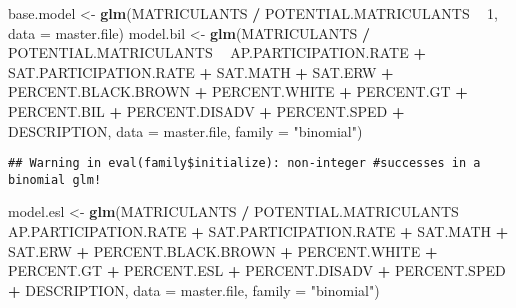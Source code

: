 \documentclass[
]{article}
\newenvironment{Shaded}{\begin{snugshade}}{\end{snugshade}}
\newcommand{\DataTypeTok}[1]{\textcolor[rgb]{0.13,0.29,0.53}{#1}}
\newcommand{\DecValTok}[1]{\textcolor[rgb]{0.00,0.00,0.81}{#1}}
\newcommand{\KeywordTok}[1]{\textcolor[rgb]{0.13,0.29,0.53}{\textbf{#1}}}
\newcommand{\NormalTok}[1]{#1}
\newcommand{\OperatorTok}[1]{\textcolor[rgb]{0.81,0.36,0.00}{\textbf{#1}}}
\newcommand{\StringTok}[1]{\textcolor[rgb]{0.31,0.60,0.02}{#1}}
\begin{document}
\begin{Shaded}
\begin{Highlighting}[]
\NormalTok{base.model <-}\StringTok{ }\KeywordTok{glm}\NormalTok{(MATRICULANTS }\OperatorTok{/}\StringTok{ }\NormalTok{POTENTIAL.MATRICULANTS }\OperatorTok{~}\StringTok{ }\DecValTok{1}\NormalTok{, }\DataTypeTok{data =}\NormalTok{ master.file)}
\NormalTok{model.bil <-}\StringTok{ }\KeywordTok{glm}\NormalTok{(MATRICULANTS }\OperatorTok{/}\StringTok{ }\NormalTok{POTENTIAL.MATRICULANTS }\OperatorTok{~}\StringTok{ }\NormalTok{AP.PARTICIPATION.RATE }\OperatorTok{+}\StringTok{ }\NormalTok{SAT.PARTICIPATION.RATE }\OperatorTok{+}\StringTok{ }\NormalTok{SAT.MATH }\OperatorTok{+}\StringTok{ }\NormalTok{SAT.ERW }\OperatorTok{+}\StringTok{ }\NormalTok{PERCENT.BLACK.BROWN }\OperatorTok{+}\StringTok{ }\NormalTok{PERCENT.WHITE }\OperatorTok{+}\StringTok{ }\NormalTok{PERCENT.GT }\OperatorTok{+}\StringTok{ }\NormalTok{PERCENT.BIL }\OperatorTok{+}\StringTok{ }\NormalTok{PERCENT.DISADV }\OperatorTok{+}\StringTok{ }\NormalTok{PERCENT.SPED }\OperatorTok{+}\StringTok{ }\NormalTok{DESCRIPTION, }\DataTypeTok{data =}\NormalTok{ master.file, }\DataTypeTok{family =} \StringTok{"binomial"}\NormalTok{)}
\end{Highlighting}
\end{Shaded}

\begin{verbatim}
## Warning in eval(family$initialize): non-integer #successes in a binomial glm!
\end{verbatim}

\begin{Shaded}
\begin{Highlighting}[]
\NormalTok{model.esl <-}\StringTok{ }\KeywordTok{glm}\NormalTok{(MATRICULANTS }\OperatorTok{/}\StringTok{ }\NormalTok{POTENTIAL.MATRICULANTS }\OperatorTok{~}\StringTok{ }\NormalTok{AP.PARTICIPATION.RATE }\OperatorTok{+}\StringTok{ }\NormalTok{SAT.PARTICIPATION.RATE }\OperatorTok{+}\StringTok{ }\NormalTok{SAT.MATH }\OperatorTok{+}\StringTok{ }\NormalTok{SAT.ERW }\OperatorTok{+}\StringTok{ }\NormalTok{PERCENT.BLACK.BROWN }\OperatorTok{+}\StringTok{ }\NormalTok{PERCENT.WHITE }\OperatorTok{+}\StringTok{ }\NormalTok{PERCENT.GT }\OperatorTok{+}\StringTok{ }\NormalTok{PERCENT.ESL }\OperatorTok{+}\StringTok{ }\NormalTok{PERCENT.DISADV }\OperatorTok{+}\StringTok{ }\NormalTok{PERCENT.SPED }\OperatorTok{+}\StringTok{ }\NormalTok{DESCRIPTION, }\DataTypeTok{data =}\NormalTok{ master.file, }\DataTypeTok{family =} \StringTok{"binomial"}\NormalTok{)}
\end{Highlighting}
\end{Shaded}
\end{document}

